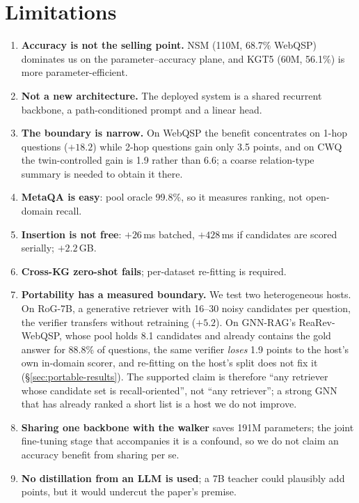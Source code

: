 \documentclass[sigconf,review,anonymous]{acmart}
\begin{document}
\section{Limitations}
\label{sec:limitations}

\begin{enumerate}
\item \textbf{Accuracy is not the selling point.} NSM (110M, 68.7\% WebQSP) dominates us on the parameter--accuracy plane, and KGT5 (60M, 56.1\%) is more parameter-efficient.
\item \textbf{Not a new architecture.} The deployed system is a shared recurrent backbone, a path-conditioned prompt and a linear head.
\item \textbf{The boundary is narrow.} On WebQSP the benefit concentrates on 1-hop questions ($+18.2$) while 2-hop questions gain only 3.5 points, and on CWQ the twin-controlled gain is 1.9 rather than 6.6; a coarse relation-type summary is needed to obtain it there.
\item \textbf{MetaQA is easy}: pool oracle 99.8\%, so it measures ranking, not open-domain recall.
\item \textbf{Insertion is not free}: $+26$\,ms batched, $+428$\,ms if candidates are scored serially; $+2.2$\,GB.
\item \textbf{Cross-KG zero-shot fails}; per-dataset re-fitting is required.
\item \textbf{Portability has a measured boundary.} We test two heterogeneous hosts. On RoG-7B, a generative retriever with 16--30 noisy candidates per question, the verifier transfers without retraining ($+5.2$). On GNN-RAG's ReaRev-WebQSP, whose pool holds 8.1 candidates and already contains the gold answer for 88.8\% of questions, the same verifier \emph{loses} 1.9 points to the host's own in-domain scorer, and re-fitting on the host's split does not fix it (\S\ref{sec:portable-results}). The supported claim is therefore ``any retriever whose candidate set is recall-oriented'', not ``any retriever''; a strong GNN that has already ranked a short list is a host we do not improve.
\item \textbf{Sharing one backbone with the walker} saves 191M parameters; the joint fine-tuning stage that accompanies it is a confound, so we do not claim an accuracy benefit from sharing per se.
\item \textbf{No distillation from an LLM is used}; a 7B teacher could plausibly add points, but it would undercut the paper's premise.
\end{enumerate}
\end{document}

